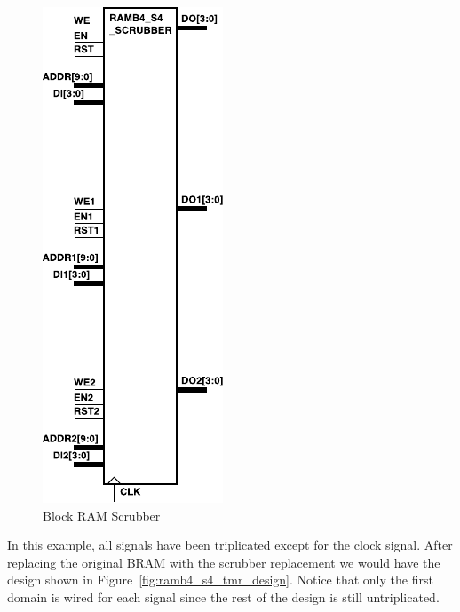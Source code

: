 \begin{figure}[htb]
\begin{center}
\includegraphics[scale=1]{ramb4_s4_tmr.pdf}
\caption{Block RAM Scrubber}
\label{fig:ramb4_s4_tmr}
\end{center}
\end{figure}

In this example, all signals have been triplicated except for the clock signal.
After replacing the original BRAM with the scrubber replacement we would have
the design shown in Figure~\ref{fig:ramb4_s4_tmr_design}. Notice that only the
first domain is wired for each signal since the rest of the design is still
untriplicated.

